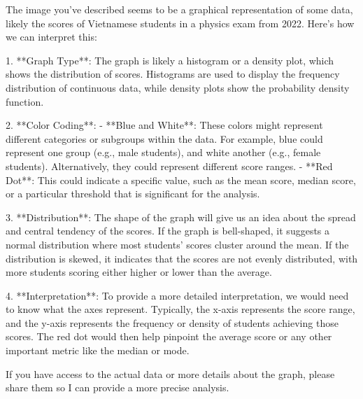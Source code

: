 The image you've described seems to be a graphical representation of some data, likely the scores of Vietnamese students in a physics exam from 2022. Here's how we can interpret this:

1. **Graph Type**: The graph is likely a histogram or a density plot, which shows the distribution of scores. Histograms are used to display the frequency distribution of continuous data, while density plots show the probability density function.

2. **Color Coding**:
   - **Blue and White**: These colors might represent different categories or subgroups within the data. For example, blue could represent one group (e.g., male students), and white another (e.g., female students). Alternatively, they could represent different score ranges.
   - **Red Dot**: This could indicate a specific value, such as the mean score, median score, or a particular threshold that is significant for the analysis.

3. **Distribution**: The shape of the graph will give us an idea about the spread and central tendency of the scores. If the graph is bell-shaped, it suggests a normal distribution where most students' scores cluster around the mean. If the distribution is skewed, it indicates that the scores are not evenly distributed, with more students scoring either higher or lower than the average.

4. **Interpretation**: To provide a more detailed interpretation, we would need to know what the axes represent. Typically, the x-axis represents the score range, and the y-axis represents the frequency or density of students achieving those scores. The red dot would then help pinpoint the average score or any other important metric like the median or mode.

If you have access to the actual data or more details about the graph, please share them so I can provide a more precise analysis.
